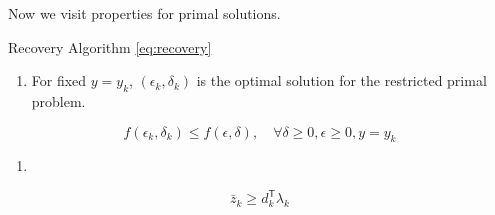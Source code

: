 \documentclass[../main]{subfiles}
\begin{document}
Now we visit properties for primal solutions.

\begin{theorem} \label{lemma:recovery}  Recovery Algorithm \eqref{eq:recovery}
  \begin{enumerate}
    \def\labelenumi{(\alph{enumi})}

    \item
          For fixed \(y=y_k\), \((\epsilon_k, \delta_k)\) is the optimal
          solution for the restricted primal problem.
  \end{enumerate}

  \[f(\epsilon_k, \delta_k) \le f(\epsilon, \delta), \quad \forall \delta\ge 0, \epsilon\ge 0, y= y_k\]



  \begin{enumerate}
    \def\labelenumi{(\alph{enumi})}
    \setcounter{enumi}{1}

    \item
  \end{enumerate}
  \[\bar z_k \ge d_k^\mathsf{T} \lambda_k\]

\end{theorem}
\end{document}
